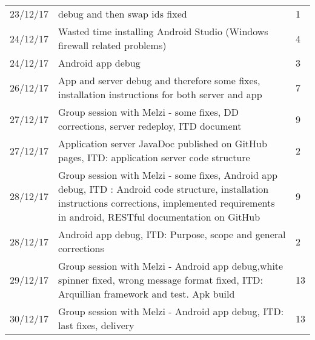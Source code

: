 \begin{longtable}{ p{2cm} p{10cm} p{3cm}}
	23/12/17 & debug and then swap ids fixed & 1 \\
	24/12/17 & Wasted time installing Android Studio (Windows firewall related problems) & 4 \\
	24/12/17 & Android app debug & 3 \\
	26/12/17 & App and server debug and therefore some fixes, installation instructions for both server and app & 7 \\
	27/12/17 & Group session with Melzi - some fixes, DD corrections, server redeploy, ITD document & 9 \\
	27/12/17 & Application server JavaDoc published on GitHub pages, ITD: application server code structure & 2 \\
	28/12/17 & Group session with Melzi - some fixes, Android app debug, ITD : Android code structure, installation instructions corrections, implemented requirements in android, RESTful documentation on GitHub  & 9 \\
	28/12/17 &  Android app debug, ITD: Purpose, scope and general corrections & 2 \\
	29/12/17 & Group session with Melzi - Android app debug,white spinner fixed, wrong message format fixed, ITD: Arquillian framework and test. Apk build & 13 \\
	30/12/17 & Group session with Melzi - Android app debug, ITD: last fixes, delivery & 13 \\
\end{longtable}
